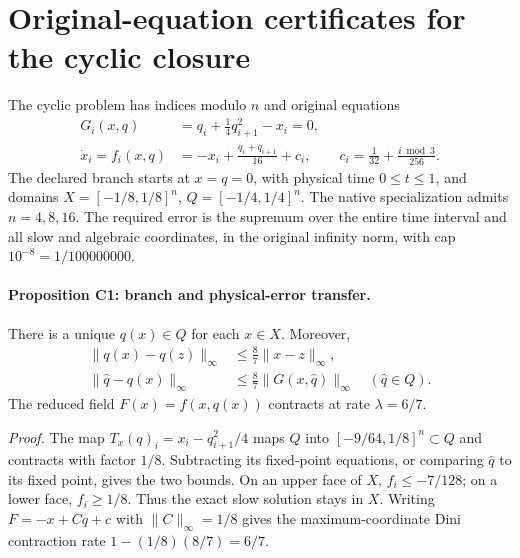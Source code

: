 
\section{Original-equation certificates for the cyclic closure}
\label{sec:cyclic-theory}

The cyclic problem has indices modulo $n$ and original equations
\begin{align}
 G_i(x,q)&=q_i+\frac14q_{i+1}^{2}-x_i=0,\label{eq:cyclic-original}\\
 \dot x_i=f_i(x,q)&=-x_i+\frac{q_i+q_{i+1}}{16}+c_i,
 \qquad c_i=\frac1{32}+\frac{i\bmod3}{256}.
\end{align}
The declared branch starts at $x=q=0$, with physical time $0\le t\le1$,
and domains $X=[-1/8,1/8]^n$, $Q=[-1/4,1/4]^n$.
The native specialization admits $n=4,8,16$.
The required error is the supremum over the entire time interval and all
slow and algebraic coordinates, in the original infinity norm, with cap
$10^{-8}=1/100000000$.

\paragraph{Proposition C1: branch and physical-error transfer.}
There is a unique $q(x)\in Q$ for each $x\in X$. Moreover,
\begin{align}
 \|q(x)-q(z)\|_\infty&\le\frac87\|x-z\|_\infty,\label{eq:cyclic-rootlip}\\
 \|\widehat q-q(x)\|_\infty&\le\frac87\|G(x,\widehat q)\|_\infty
 \quad(\widehat q\in Q).
\end{align}
The reduced field $F(x)=f(x,q(x))$ contracts at rate $\lambda=6/7$.

\emph{Proof.}
The map $T_x(q)_i=x_i-q_{i+1}^2/4$ maps $Q$ into
$[-9/64,1/8]^n\subset Q$ and contracts with factor $1/8$.
Subtracting its fixed-point equations, or comparing $\widehat q$ to its
fixed point, gives the two bounds. On an upper face of $X$, $f_i\le-7/128$;
on a lower face, $f_i\ge1/8$. Thus the exact slow solution stays in $X$.
Writing $F=-x+Cq+c$ with $\|C\|_\infty=1/8$ gives the maximum-coordinate
Dini contraction rate $1-(1/8)(8/7)=6/7$.

